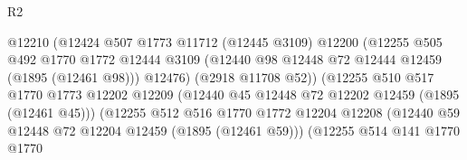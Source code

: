 \begin{lexlean}{R2}
\begin{coremodule}
                                        @12210
                                        (@12424
                                          @507
                                          @1773
                                          @11712
                                          (@12445 @3109)
                                          @12200
                                          (@12255
                                            @505
                                            @492
                                            @1770
                                            @1772
                                            @12444
                                            @3109
                                            (@12440
                                              @98
                                              @12448
                                              @72
                                              @12444
                                              @12459
                                              (@1895 (@12461 @98)))
                                            @12476)
                                          (@2918 @11708 @52))
                                        (@12255
                                          @510
                                          @517
                                          @1770
                                          @1773
                                          @12202
                                          @12209
                                          (@12440 @45 @12448 @72 @12202 @12459 (@1895 (@12461 @45)))
                                          (@12255
                                            @512
                                            @516
                                            @1770
                                            @1772
                                            @12204
                                            @12208
                                            (@12440
                                              @59
                                              @12448
                                              @72
                                              @12204
                                              @12459
                                              (@1895 (@12461 @59)))
                                            (@12255
                                              @514
                                              @141
                                              @1770
                                              @1770

\end{coremodule}
\end{lexlean}
